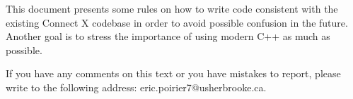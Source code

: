 %

%
%
%
%

This document presents some rules on how to write code consistent with the 
existing Connect X codebase in order to avoid possible confusion in the future. 
Another goal is to stress the importance of using modern C++ as much as possible.

If you have any comments on this text or you have mistakes to report, please 
write to the following address: eric.poirier7@usherbrooke.ca.